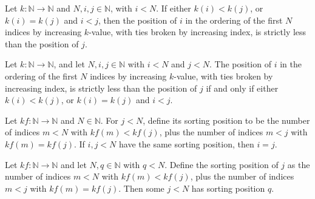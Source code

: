 \begin{theorem}
\label{Light.sortPos_lt_sortPos}
\leanok
{}
Let $k:\mathbb{N}\to\mathbb{N}$ and $N,i,j\in\mathbb{N}$, with $i<N$. If either
$k(i)<k(j)$, or $k(i)=k(j)$ and $i<j$, then the position of $i$ in the ordering of the
first $N$ indices by increasing $k$-value, with ties broken by increasing index, is
strictly less than the position of $j$.
\end{theorem}

\begin{theorem}
\label{Light.sortPos_lt_sortPos_iff}
\leanok
{}
Let $k:\mathbb{N}\to\mathbb{N}$, and let $N,i,j\in\mathbb{N}$ with $i<N$ and $j<N$. The
position of $i$ in the ordering of the first $N$ indices by increasing $k$-value, with
ties broken by increasing index, is strictly less than the position of $j$ if and only
if either $k(i)<k(j)$, or $k(i)=k(j)$ and $i<j$.
\end{theorem}

\begin{theorem}
\label{Light.eq_of_sortPos_eq}
\leanok
{}
Let $kf:\mathbb N\to\mathbb N$ and $N\in\mathbb N$. For $j<N$, define its sorting
position to be the number of indices $m<N$ with $kf(m)<kf(j)$, plus the number of
indices $m<j$ with $kf(m)=kf(j)$. If $i,j<N$ have the same sorting position, then $i=j$.
\end{theorem}

\begin{theorem}
\label{Light.exists_sortPos_eq}
\leanok
{}
Let $kf:\mathbb N\to\mathbb N$ and let $N,q\in\mathbb N$ with $q<N$. Define the sorting
position of $j$ as the number of indices $m<N$ with $kf(m)<kf(j)$, plus the number of
indices $m<j$ with $kf(m)=kf(j)$. Then some $j<N$ has sorting position $q$.
\end{theorem}
